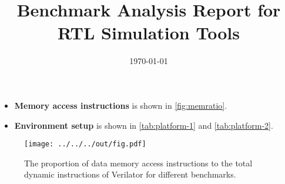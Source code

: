 \documentclass{article}
\title{Benchmark Analysis Report for RTL Simulation Tools}
\date{\today}
\author{}
\begin{document}
\maketitle

\begin{itemize}[noitemsep,topsep=0pt]
    \item {\bf Memory access instructions } is shown in \autoref{fig:memratio}.
    \item {\bf Environment setup} is shown in \autoref{tab:platform-1} and \autoref{tab:platform-2}.
  \end{itemize}

\begin{figure}[h!]
  \centering
  \texttt{[image: ../../../out/fig.pdf]}
  \vspace*{-4mm}
  \caption{The proportion of data memory access instructions to the total dynamic instructions of Verilator for different benchmarks.}
  \label{fig:memratio}
\end{figure}


\centering

\end{document}
